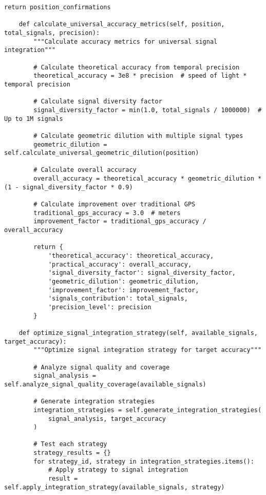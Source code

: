 \documentclass[12pt,a4paper]{article}
\begin{document}
\begin{lstlisting}[style=pythonstyle, caption=Universal Signal Integration for GPS Enhancement]
        return position_confirmations
    
    def calculate_universal_accuracy_metrics(self, position, total_signals, precision):
        """Calculate accuracy metrics for universal signal integration"""
        
        # Calculate theoretical accuracy from temporal precision
        theoretical_accuracy = 3e8 * precision  # speed of light * temporal precision
        
        # Calculate signal diversity factor
        signal_diversity_factor = min(1.0, total_signals / 1000000)  # Up to 1M signals
        
        # Calculate geometric dilution with multiple signal types
        geometric_dilution = self.calculate_universal_geometric_dilution(position)
        
        # Calculate overall accuracy
        overall_accuracy = theoretical_accuracy * geometric_dilution * (1 - signal_diversity_factor * 0.9)
        
        # Calculate improvement over traditional GPS
        traditional_gps_accuracy = 3.0  # meters
        improvement_factor = traditional_gps_accuracy / overall_accuracy
        
        return {
            'theoretical_accuracy': theoretical_accuracy,
            'practical_accuracy': overall_accuracy,
            'signal_diversity_factor': signal_diversity_factor,
            'geometric_dilution': geometric_dilution,
            'improvement_factor': improvement_factor,
            'signals_contribution': total_signals,
            'precision_level': precision
        }
    
    def optimize_signal_integration_strategy(self, available_signals, target_accuracy):
        """Optimize signal integration strategy for target accuracy"""
        
        # Analyze signal quality and coverage
        signal_analysis = self.analyze_signal_quality_coverage(available_signals)
        
        # Generate integration strategies
        integration_strategies = self.generate_integration_strategies(
            signal_analysis, target_accuracy
        )
        
        # Test each strategy
        strategy_results = {}
        for strategy_id, strategy in integration_strategies.items():
            # Apply strategy to signal integration
            result = self.apply_integration_strategy(available_signals, strategy)
            

\end{lstlisting}
\end{document}
